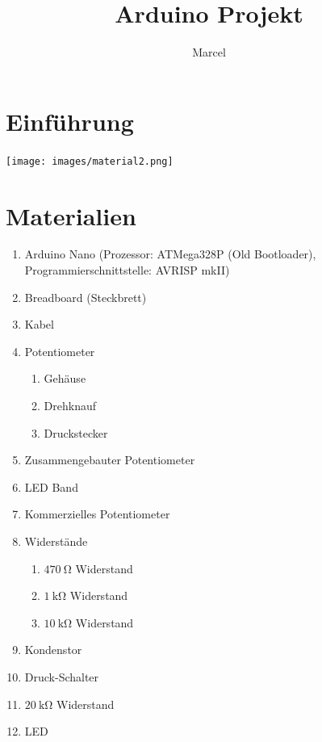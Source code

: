 \documentclass[a4paper,12pt]{book}
\begin{document}
\title{Arduino Projekt}
\author{Marcel}
\date{}



\section*{Einführung}

\begin{center}
\texttt{[image: images/material2.png]}
\end{center}

\section*{Materialien}
\begin{multicols}{2}
\begin{enumerate}[label=\arabic*)]
  \item Arduino Nano (Prozessor: ATMega328P (Old Bootloader), Programmierschnittstelle: AVRISP mkII)
  \item Breadboard (Steckbrett)
  \item Kabel
  \item Potentiometer
  \begin{enumerate}
    \item Gehäuse 
    \item Drehknauf
    \item Druckstecker
  \end{enumerate}
  \item Zusammengebauter Potentiometer
  \item LED Band
  \item Kommerzielles Potentiometer
  \item Widerstände
  \begin{enumerate}
    \item $\SI{470}{\ohm}$ Widerstand
    \item $\SI{1}{\kohm}$ Widerstand
    \item $\SI{10}{\kohm}$ Widerstand
  \end{enumerate}
  \item Kondenstor
  \item Druck-Schalter
  \item $\SI{20}{\kohm}$ Widerstand
  \item LED
\end{enumerate}
\end{multicols}
\end{document}
